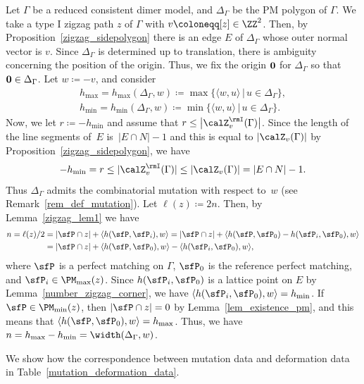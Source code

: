 \begin{setting}
\label{mutation_deformation_setting}
Let $\Gamma$ be a reduced consistent dimer model, and $\Delta_\Gamma$ be the PM polygon of $\Gamma$.
We take a type I zigzag path $z$ of $\Gamma$ with $v\coloneqq [z]\in\ZZ^2$. Then, by Proposition~\ref{zigzag_sidepolygon}
there is an edge $E$ of $\Delta_\Gamma$ whose outer normal vector is $v$.
Since $\Delta_\Gamma$ is determined up to translation, there is ambiguity concerning the position of the origin.
Thus, we fix the origin ${\bf 0}$ for $\Delta_\Gamma$ so that ${\bf 0}\in\Delta_\Gamma$.
Let $w\coloneqq -v$, and consider
\begin{gather*}
h_{\max}= h_{\max}(\Delta_\Gamma,w)\coloneqq{\max}\{\langle w,u\rangle \,|\, u\in \Delta_\Gamma\},
\\
h_{\min}= h_{\min}(\Delta_\Gamma,w)\coloneqq{\min}\{\langle w,u\rangle \,|\, u\in \Delta_\Gamma\}.
\end{gather*}
Now, we let $r\coloneqq-h_{\min}$ and assume that $r\le\big|\calZ_v^\rmI(\Gamma)\big|$.
Since the length of the line segments of~$E$ is~$|E\cap N|-1$ and this is equal to $|\calZ_v(\Gamma)|$ by Proposition~\ref{zigzag_sidepolygon}, we have
\begin{displaymath}
-h_{\min}=r\le|\calZ_v^\rmI(\Gamma)|\le|\calZ_v(\Gamma)|=|E\cap N|-1.
\end{displaymath}
Thus $\Delta_\Gamma$ admits the combinatorial mutation with respect to~$w$ (see Remark~\ref{rem_def_mutation}).
Let $\ell(z)\coloneqq2n$. Then, by Lemma~\ref{zigzag_lem1} we have
\begin{align*}
n=\ell(z)/2&=|\sfP\cap z|+\langle h(\sfP,\sfP_i),w\rangle =|\sfP\cap z|+\langle h(\sfP,\sfP_0)-h(\sfP_i,\sfP_0),w\rangle\\
&=|\sfP\cap z|+\langle h(\sfP,\sfP_0),w\rangle-\langle h(\sfP_i,\sfP_0),w\rangle,
\end{align*}
where $\sfP$ is a perfect matching on $\Gamma$, $\sfP_0$ is the reference perfect matching, and $\sfP_i\in\PM_{\max}(z)$.
Since $h(\sfP_i,\sfP_0)$ is a lattice point on $E$ by Lemma~\ref{number_zigzag_corner}, we have $\langle h(\sfP_i,\sfP_0),w\rangle=h_{\min}$.
If $\sfP\in\PM_{\min}(z)$, then $|\sfP\cap z|=0$ by Lemma~\ref{lem_existence_pm}, and this means that $\langle h(\sfP,\sfP_0),w\rangle=h_{\max}$.
Thus, we have $n=h_{\max}-h_{\min}=\width(\Delta_\Gamma,w)$.


We show how the correspondence between mutation data and deformation data in Table~\ref{mutation_deformation_data}.


\end{setting}
